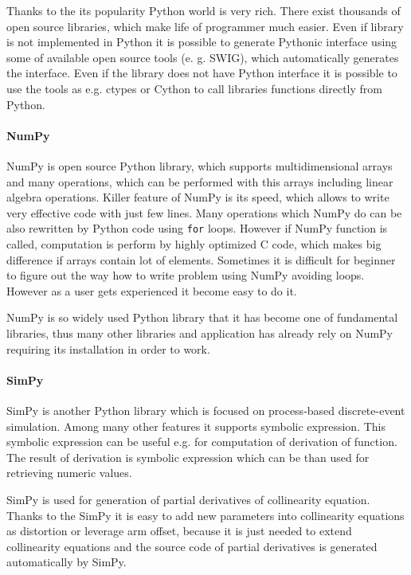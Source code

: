 \documentclass[a4paper,12pt]{article}
\begin{document}

Thanks to the its popularity Python world is very rich. There exist
thousands of open source libraries, which make life of programmer much easier. Even 
if library is not implemented in Python it is possible to generate Pythonic 
interface using some of available open source tools (e. g. SWIG), which automatically
generates the interface. Even if the library does not have Python interface it 
is possible to use the tools as e.g. ctypes or Cython to call libraries functions directly from Python.

\paragraph{NumPy}


NumPy is open source Python library, which supports multidimensional arrays and many operations, which can be
performed with this arrays including linear algebra operations. Killer feature of NumPy is its speed,
which allows to write very effective code with just few lines. Many operations which NumPy do can be 
also rewritten by Python code using  {\tt for} loops. However if NumPy function is called,
computation is perform by highly optimized C code, which makes big difference if arrays contain 
lot of elements. Sometimes it is difficult for beginner to figure out the way how 
to write problem using NumPy avoiding loops. However as a user gets experienced 
it become easy to do it. 

NumPy is so widely used Python library that it has become one of fundamental libraries, thus many
other libraries and application has already rely on NumPy requiring its installation in order to work.

\paragraph{SimPy}

SimPy is another Python library which is focused on process-based discrete-event simulation.
Among many other features it supports symbolic expression. This symbolic expression can be useful
e.g. for computation of derivation of function. The result of derivation is symbolic expression which can 
be than used for retrieving numeric values. 

SimPy is used for generation of partial derivatives of collinearity equation. Thanks to the SimPy 
it is easy to add new parameters into collinearity equations as distortion or leverage arm offset,
because it is just needed to extend collinearity equations and the source code of partial derivatives 
is generated automatically by SimPy. 
\end{document}
